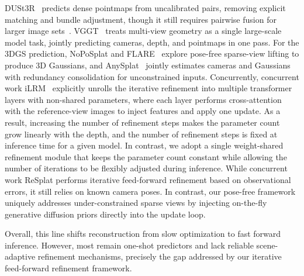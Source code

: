 DUSt3R~\cite{wang2024dust3r} predicts dense pointmaps from uncalibrated pairs, removing explicit matching and bundle adjustment, though it still requires pairwise fusion for larger image sets~\cite{leroy2024grounding}. VGGT~\cite{wang2025vggt} treats multi-view geometry as a single large-scale model task, jointly predicting cameras, depth, and pointmaps in one pass. For the 3DGS prediction, NoPoSplat and FLARE~\cite{ye2024no, zhang2025flare} explore pose-free sparse-view lifting to produce 3D Gaussians, and AnySplat~\cite{jiang2025anysplat} jointly estimates cameras and Gaussians with redundancy consolidation for unconstrained inputs. Concurrently, concurrent work iLRM~\cite{kang2025ilrm} explicitly unrolls the iterative refinement into multiple transformer layers with non-shared parameters, where each layer performs cross-attention with the reference-view images to inject features and apply one update. As a result, increasing the number of refinement steps makes the parameter count grow linearly with the depth, and the number of refinement steps is fixed at inference time for a given model. In contrast, we adopt a single weight-shared refinement module that keeps the parameter count constant while allowing the number of iterations to be flexibly adjusted during inference. While concurrent work ReSplat \cite{xu2025resplat} performs iterative feed-forward refinement based on observational errors, it still relies on known camera poses. In contrast, our pose-free framework uniquely addresses under-constrained sparse views by injecting on-the-fly generative diffusion priors directly into the update loop.

Overall, this line shifts reconstruction from slow optimization to fast forward inference. However, most remain one-shot predictors and lack reliable scene-adaptive refinement mechanisms, precisely the gap addressed by our iterative feed-forward refinement framework.





